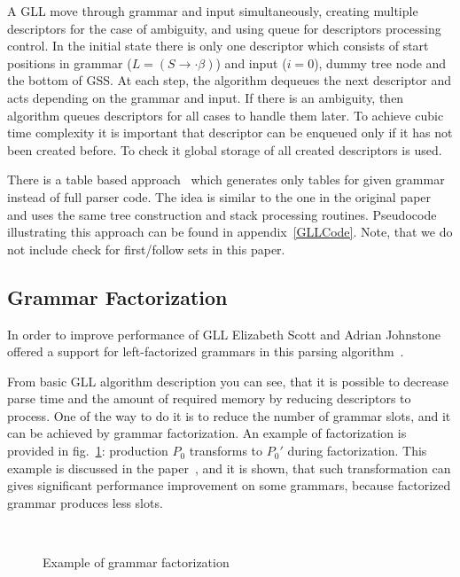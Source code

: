 \documentclass[runningheads,a4paper]{llncs}
\begin{document}
A GLL move through grammar and input simultaneously, creating multiple descriptors for the case of ambiguity, and using queue for descriptors processing control.
In the initial state there is only one descriptor which consists of start positions in grammar ($L = (S \to \cdot \beta)$) and input ($i=0$), dummy tree node and the bottom of GSS.
At each step, the algorithm dequeues the next descriptor and acts depending on the grammar and input.
If there is an ambiguity, then algorithm queues descriptors for all cases to handle them later. 
To achieve cubic time complexity it is important that descriptor can be enqueued only if it has not been created before.
To check it global storage of all created descriptors is used.

There is a table based approach~\cite{ragozina} which generates only tables for given grammar instead of full parser code.
The idea is similar to the one in the original paper and uses the same tree construction and stack processing routines.
Pseudocode illustrating this approach can be found in appendix~\ref{GLLCode}. Note, that we do not include check for first/follow sets in this paper.


\subsection{Grammar Factorization}%

In order to improve performance of GLL Elizabeth Scott and Adrian Johnstone offered a support for left-factorized grammars in this parsing algorithm~\cite{scott2016structuring}. 

From basic GLL algorithm description you can see, that it is possible to decrease parse time and the amount of required memory by reducing descriptors to process.
One of the way to do it is to reduce the number of grammar slots, and it can be achieved by grammar factorization.
An example of factorization is provided in fig.~\ref{fig:ExampleOfFactorization}: production $P_0$ transforms to $P_0'$ during factorization.
This example is discussed in the paper~\cite{scott2016structuring}, and it is shown, that such transformation can gives significant performance improvement on some grammars, because 
factorized grammar produces less slots.

\begin{figure}
    \centering
    ~
    \caption{Example of grammar factorization}
    \label{fig:ExampleOfFactorization}
\end{figure}
\end{document}
